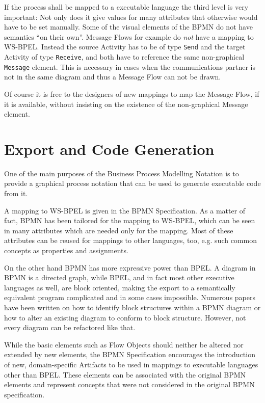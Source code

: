 If the process shall be mapped to a executable language the third level is very
important: Not only does it give values for many attributes that otherwise would
have to be set manually.  Some of the visual elements of the BPMN do not have
semantics ``on their own''.  Message Flows for example do \emph{not} have a
mapping to WS-BPEL.  Instead the source Activity has to be of type \texttt{Send}
and the target Activity of type \texttt{Receive}, and both have to reference the
same non-graphical \texttt{Message} element.  This is necessary in cases when the
communications partner is not in the same diagram and thus a Message Flow can not
be drawn.

Of course it is free to the designers of new mappings to map the Message Flow, if
it is available, without insisting on the existence of the non-graphical Message
element.



\section{Export and Code Generation}
\label{sec:bpmn_export}

One of the main purposes of the Business Process Modelling Notation is to provide
a graphical process notation that can be used to generate executable code from it.

A mapping to WS-BPEL is given in the BPMN Specification.  As a matter of fact,
BPMN has been tailored for the mapping to WS-BPEL, which can be seen in many
attributes which are needed only for the mapping.  Most of these attributes can
be reused for mappings to other languages, too, e.g. such common concepts as
properties and assignments.

On the other hand BPMN has more expressive power than BPEL.  A diagram in BPMN is
a directed graph, while BPEL, and in fact most other executive languages as well,
are block oriented, making the export to a semantically equivalent program
complicated and in some cases impossible.  Numerous papers have been written on
how to identify block structures within a BPMN diagram or how to alter an existing
diagram to conform to block structure.  However, not every diagram can be
refactored like that.

While the basic elements such as Flow Objects should neither be altered nor
extended by new elements, the BPMN Specification encourages the introduction of
new, domain-specific Artifacts to be used in mappings to executable languages
other than BPEL.  These elements can be associated with the original BPMN elements
and represent concepts that were not considered in the original BPMN specification.

